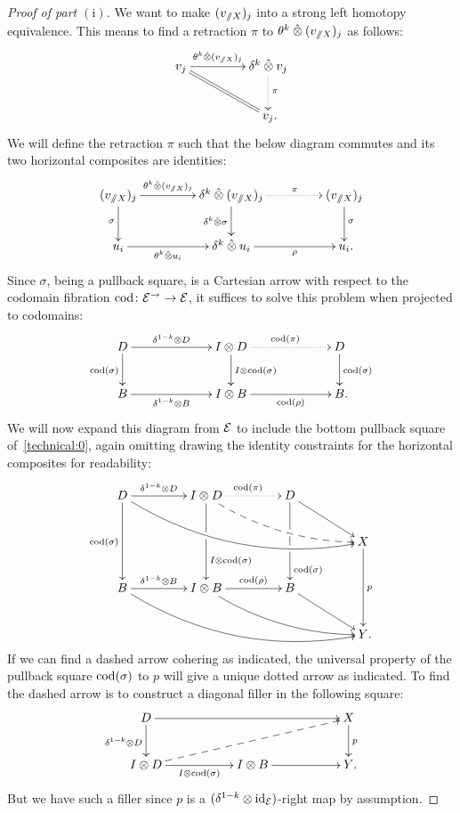 \documentclass[reqno,10pt,a4paper,oneside,draft]{amsart}
\begin{document}
\begin{proof}[Proof of part $\mathrm{(i)}$]
We want to make $(v_{\sslash X})_j$ into a strong left homotopy equivalence.
This means to find a retraction $\pi$ to $\theta^k \mathbin{\hat{\otimes}} (v_{\sslash X})_j$ as follows:
\[
\xymatrix@C+2em{
  v_j
  \ar[r]^-{\thetak \hatotimes (v_{\fakeslice X})_j}
  \ar@{=}[dr]
&
  \kcyl \hatotimes v_j
  \ar@{.>}[d]^{\pi}
\\&
  v_j
\rlap{.}}
\]
We will define the retraction $\pi$ such that the below diagram commutes and its two horizontal composites are identities:
\[
\xymatrix@C+2em{
  (v_{\fakeslice X})_j
  \ar[r]^-{\thetak \hatotimes (v_{\fakeslice X})_j}
  \ar[d]_{\sigma}
&
  \kcyl \hatotimes (v_{\fakeslice X})_j
  \ar@{.>}[r]^-{\pi}
  \ar[d]_{\kcyl \hatotimes \sigma}
&
  (v_{\fakeslice X})_j
  \ar[d]^{\sigma}
\\
  u_i
  \ar[r]_-{\thetak \hatotimes u_i}
&
  \kcyl \hatotimes u_i
  \ar[r]_-{\rho}
&
  u_i
\rlap{.}}
\]
Since $\sigma$, being a pullback square, is a Cartesian arrow with respect to the codomain fibration $\operatorname{cod} \colon \mathcal{E}^\to \to \mathcal{E}$, it suffices to solve this problem when projected to codomains:
\[
\xymatrix@C+4em{
  D
  \ar[r]^-{\kcylinv \otimes D}
  \ar[d]_{\cod(\sigma)}
&
  \interval \otimes D
  \ar@{.>}[r]^{\cod(\pi)}
  \ar[d]^{\interval \otimes \cod(\sigma)}
&
  D
  \ar[d]^{\cod(\sigma)}
\\
  B
  \ar[r]_-{\kcylinv \otimes B}
&
  \interval \otimes B
  \ar[r]_-{\cod(\rho)}
&
  B
\rlap{.}}
\]
We will now expand this diagram from $\mathcal{E}$ to include the bottom pullback square of~\eqref{technical:0}, again omitting drawing the identity constraints for the horizontal composites for readability:
\[
\xymatrix@C+2em{
  D
  \ar[r]^-{\kcylinv \otimes D}
  \ar[dd]_{\cod(\sigma)}
  \ar@/_2em/[drrr]
&
  \interval \otimes D
  \ar@{.>}[r]^{\cod(\pi)}
  \ar[dd]^(0.7){\interval \otimes \cod(\sigma)}|(0.43){\hole}
  \ar@{-->}@/_1em/[drr]
&
  D
  \ar[dd]^(0.8){\cod(\sigma)}|(0.40){\hole}|(0.57){\hole}
  \ar[dr]
\\&&&
  X
  \ar[dd]^{p}
\\
  B
  \ar[r]^-{\kcylinv \otimes B}
  \ar@/_2em/[drrr]
&
  \interval \otimes B
  \ar[r]^-{\cod(\rho)}
  \ar@/_1em/[drr]
&
  B
  \ar[dr]
\\&&&
  Y
\rlap{.}}
\]
If we can find a dashed arrow cohering as indicated, the universal property of the pullback square $\operatorname{cod}(\sigma)$ to $p$ will give a unique dotted arrow as indicated.
To find the dashed arrow is to construct a diagonal filler in the following square:
\[
\xymatrix@C+3em{
  D
  \ar[rr]
  \ar[d]_{\kcylinv \otimes D}
&&
  X
  \ar[d]^{p}
\\
  \interval \otimes D
  \ar[r]_{I \otimes \cod(\sigma)}
  \ar@{-->}[urr]
&
  \interval \otimes B
  \ar[r]
&
  Y
\rlap{.}}
\]
But we have such a filler since $p$ is a $(\delta^{1-k} \otimes \operatorname{id}_{\mathcal{E}})$-right map by assumption.


\end{proof}
\end{document}
